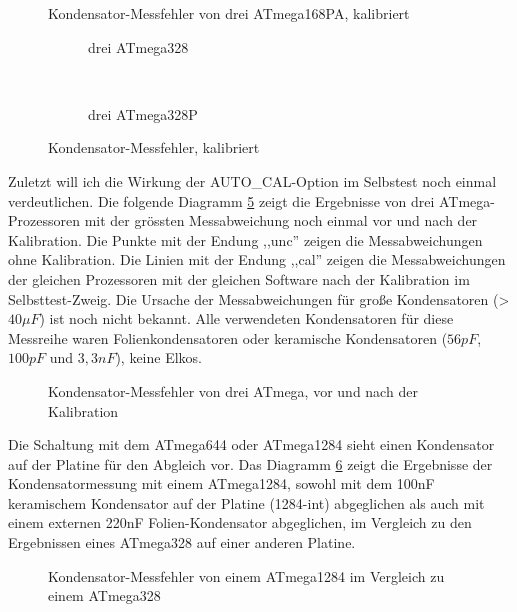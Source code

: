\begin{figure}[H]
\centering

\caption{Kondensator-Messfehler von drei ATmega168PA, kalibriert}
\label{fig:mega168PAcal}
\end{figure}

\begin{figure}[H]
  \begin{subfigure}[b]{9cm}
    \centering
    \resizebox{9cm}{!}{}
    \caption{drei ATmega328}
    \label{fig:mega328cal}
  \end{subfigure}
  ~
  \begin{subfigure}[b]{9cm}
    \centering
    \resizebox{9cm}{!}{}
    \caption{drei ATmega328P}
    \label{fig:mega328Pcal}
  \end{subfigure}
  \caption{Kondensator-Messfehler, kalibriert}
\end{figure}

Zuletzt will ich die Wirkung der AUTO\_CAL-Option im Selbstest noch einmal verdeutlichen.
Die folgende Diagramm \ref{fig:MegaAuto} zeigt die Ergebnisse von drei ATmega-Prozessoren 
mit der grössten Messabweichung noch einmal vor und nach der Kalibration.
Die Punkte mit der Endung ,,unc'' zeigen die Messabweichungen ohne Kalibration.
Die Linien mit der Endung ,,cal'' zeigen die Messabweichungen der gleichen Prozessoren
mit der gleichen Software nach der Kalibration im Selbsttest-Zweig.
Die Ursache der Messabweichungen für große Kondensatoren (\textgreater\(40 \mu F\)) ist
noch nicht bekannt. Alle verwendeten Kondensatoren für diese Messreihe waren
Folienkondensatoren oder keramische Kondensatoren (\(56 pF\), \(100 pF\) und \(3,3 nF\)), keine Elkos.

\begin{figure}[H]
\centering

\caption{Kondensator-Messfehler von drei ATmega, vor und nach der Kalibration}
\label{fig:MegaAuto}
\end{figure}

Die Schaltung mit dem ATmega644 oder ATmega1284 sieht einen Kondensator auf der Platine für den Abgleich
vor. Das Diagramm \ref{fig:Mega1284} zeigt die Ergebnisse der Kondensatormessung mit einem ATmega1284,
sowohl mit dem 100nF keramischem Kondensator auf der Platine (1284-int) abgeglichen als auch mit
einem externen 220nF Folien-Kondensator abgeglichen, im Vergleich zu den Ergebnissen eines ATmega328 auf einer
anderen Platine.

\begin{figure}[H]
\centering

\caption{Kondensator-Messfehler von einem ATmega1284 im Vergleich zu einem ATmega328}
\label{fig:Mega1284}
\end{figure}
